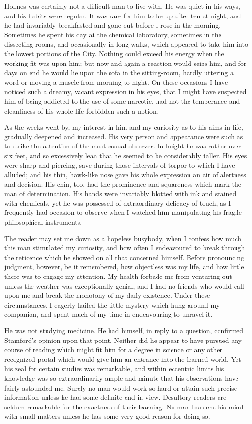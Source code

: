 \documentclass[12pt]{book}
\begin{document}
Holmes was certainly not a difficult man to live with. He was quiet in his ways, and his habits were regular. It was rare for him to be up after ten at night, and he had invariably breakfasted and gone out before I rose in the morning. Sometimes he spent his day at the chemical laboratory, sometimes in the dissecting-rooms, and occasionally in long walks, which appeared to take him into the lowest portions of the City. Nothing could exceed his energy when the working fit was upon him; but now and again a reaction would seize him, and for days on end he would lie upon the sofa in the sitting-room, hardly uttering a word or moving a muscle from morning to night. On these occasions I have noticed such a dreamy, vacant expression in his eyes, that I might have suspected him of being addicted to the use of some narcotic, had not the temperance and cleanliness of his whole life forbidden such a notion. 

As the weeks went by, my interest in him and my curiosity as to his aims in life, gradually deepened and increased. His very person and appearance were such as to strike the attention of the most casual observer. In height he was rather over six feet, and so excessively lean that he seemed to be considerably taller. His eyes were sharp and piercing, save during those intervals of torpor to which I have alluded; and his thin, hawk-like nose gave his whole expression an air of alertness and decision. His chin, too, had the prominence and squareness which mark the man of determination. His hands were invariably blotted with ink and stained with chemicals, yet he was possessed of extraordinary delicacy of touch, as I frequently had occasion to observe when I watched him manipulating his fragile philosophical instruments. 

The reader may set me down as a hopeless busybody, when I confess how much this man stimulated my curiosity, and how often I endeavoured to break through the reticence which he showed on all that concerned himself. Before pronouncing judgment, however, be it remembered, how objectless was my life, and how little there was to engage my attention. My health forbade me from venturing out unless the weather was exceptionally genial, and I had no friends who would call upon me and break the monotony of my daily existence. Under these circumstances, I eagerly hailed the little mystery which hung around my companion, and spent much of my time in endeavouring to unravel it. 

He was not studying medicine. He had himself, in reply to a question, confirmed Stamford’s opinion upon that point. Neither did he appear to have pursued any course of reading which might fit him for a degree in science or any other recognized portal which would give him an entrance into the learned world. Yet his zeal for certain studies was remarkable, and within eccentric limits his knowledge was so extraordinarily ample and minute that his observations have fairly astounded me. Surely no man would work so hard or attain such precise information unless he had some definite end in view. Desultory readers are seldom remarkable for the exactness of their learning. No man burdens his mind with small matters unless he has some very good reason for doing so. 
\end{document}
